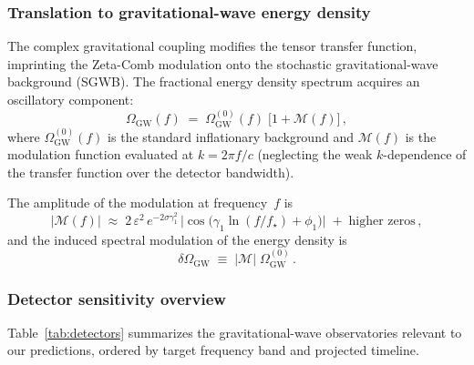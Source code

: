 \documentclass[12pt,a4paper]{article}
\begin{document}
\subsubsection{Translation to gravitational-wave
  energy density}

The complex gravitational coupling modifies the
tensor transfer function, imprinting the Zeta-Comb
modulation onto the stochastic gravitational-wave
background (SGWB).  The fractional energy density
spectrum acquires an oscillatory component:
\begin{equation}\label{eq:OmegaGW}
  \Omega_{\mathrm{GW}}(f)
  \;=\;
  \Omega_{\mathrm{GW}}^{(0)}(f)
  \;\bigl[1 + \mathcal{M}(f)\bigr]\,,
\end{equation}
where $\Omega_{\mathrm{GW}}^{(0)}(f)$ is the standard
inflationary background and $\mathcal{M}(f)$ is the
modulation function evaluated at $k = 2\pi f/c$
(neglecting the weak $k$-dependence of the transfer
function over the detector bandwidth).

The amplitude of the modulation at frequency~$f$ is
\begin{equation}\label{eq:modamp-f}
  |\mathcal{M}(f)|
  \;\approx\;
  2\,\varepsilon^2\,
  e^{-2\sigma\gamma_1^2}\,
  \bigl|\cos\bigl(
    \gamma_1\ln(f/f_\star) + \phi_1
  \bigr)\bigr|
  \;+\;\text{higher zeros}\,,
\end{equation}
and the induced spectral modulation of the
energy density is
\begin{equation}\label{eq:deltaOmega}
  \delta\Omega_{\mathrm{GW}}
  \;\equiv\;
  |\mathcal{M}|\;\Omega_{\mathrm{GW}}^{(0)}\,.
\end{equation}


\subsubsection{Detector sensitivity overview}

Table~\ref{tab:detectors} summarizes the
gravitational-wave observatories relevant to our
predictions, ordered by target frequency band and
projected timeline.
\end{document}
